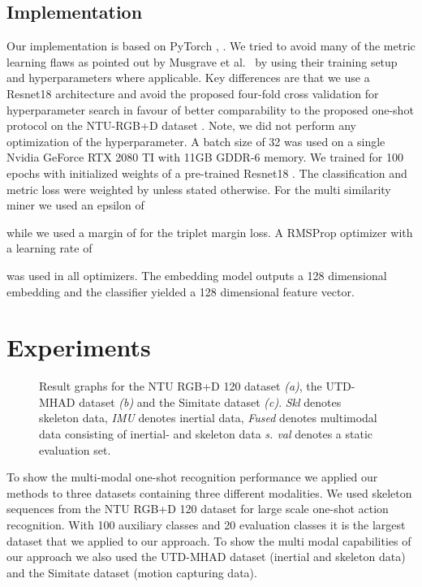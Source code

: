 \documentclass[10pt,conference,a4paper]{IEEEtran}
\def\andothers{et al.\ }
\begin{document}
        
\subsection{Implementation}

Our implementation is based on PyTorch \cite{Musgrave2019}, \cite{paszke2019pytorch}. 
We tried to avoid many of the metric learning flaws as pointed out by Musgrave \andothers \cite{musgrave2020metric} by using their training setup and hyperparameters where applicable.
Key differences are that we use a Resnet18 \cite{he2016deep} architecture and avoid the proposed four-fold cross validation for hyperparameter search in favour of better comparability to the proposed one-shot protocol on the NTU-RGB+D dataset \cite{liu2019ntu}. Note, we did not perform any optimization of the hyperparameter.
A batch size of 32 was used on a single Nvidia GeForce RTX 2080 TI with 11GB GDDR-6 memory. We trained for 100 epochs with initialized weights of a pre-trained Resnet18 \cite{he2016deep}. 
The classification and metric loss were weighted by  unless stated otherwise. For the multi similarity miner we used an epsilon of 
 
while we used a margin of  for the triplet margin loss. A 
RMSProp optimizer
with a learning rate of 

was used in all optimizers. The embedding model outputs a 128 dimensional embedding and the classifier yielded a 128 dimensional feature vector.
%
 
\section{Experiments}


\begin{figure*}[t] \centering
  \caption{Result graphs for the NTU RGB+D 120 dataset \textit{(a)}, the UTD-MHAD dataset \textit{(b)} and the Simitate dataset \textit{(c)}. \textit{Skl} denotes skeleton data, \textit{IMU} denotes inertial data, \textit{Fused} denotes multimodal data consisting of inertial- and skeleton data \textit{s. val} denotes a static evaluation set.
  }
  \label{fig:result_figs}
\end{figure*}




To show the multi-modal one-shot recognition performance we applied our methods to three datasets containing three different modalities. 
We used skeleton sequences from the NTU RGB+D 120 \cite{liu2019ntu} dataset for large scale one-shot action recognition. With 100 auxiliary classes and 20 evaluation classes it is the largest dataset that we applied to our approach. To show the multi modal capabilities of our approach we also used the UTD-MHAD \cite{chen2015utd} dataset (inertial and skeleton data) and the Simitate \cite{Memmesheimer2019SAH} dataset (motion capturing data).
\end{document}
